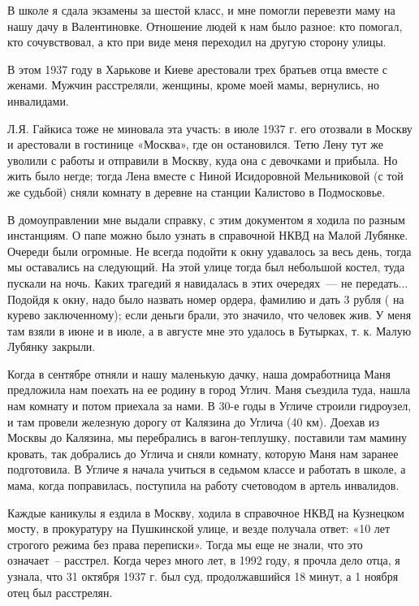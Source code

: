 В школе я сдала экзамены за шестой класс, и  мне помогли  перевезти  маму  на 
нашу  дачу в Валентиновке.  Отношение  людей  к нам  было  разное:  кто  помогал, 
кто сочувствовал, а кто при виде меня переходил на другую сторону улицы.

В этом  1937 году в Харькове и  Киеве  арестовали  трех  братьев  отца  вместе  с 
женами.  Мужчин  расстреляли,  женщины,  кроме  моей  мамы,  вернулись,  но 
инвалидами.

Л.Я. Гайкиса  тоже  не  миновала  эта  участь:  в  июле 1937 г.  его  отозвали  в 
Москву  и арестовали в гостинице «Москва», где он остановился. Тетю Лену  тут же 
уволили с работы и отправили в Москву, куда она с девочками  и  прибыла. Но  жить 
было негде; тогда  Лена вместе  с Ниной  Исидоровной  Мельниковой (с той же судьбой)
сняли комнату в  деревне на станции Калистово в Подмосковье.

В домоуправлении мне выдали справку, с этим документом  я ходила  по  разным 
инстанциям. О папе можно  было  узнать в справочной  НКВД  на  Малой Лубянке. 
Очереди были огромные. Не  всегда подойти  к окну удавалось  за  весь день,  тогда 
мы оставались  на следующий.  На  этой улице  тогда  был  небольшой  костел,  туда 
пускали на ночь.  Каких  трагедий  я  навидалась  в  этих  очередях~--- не передать... 
Подойдя к окну,  надо  было  назвать  номер  ордера, фамилию  и дать  3 рубля  ( на 
курево заключенному); если деньги брали,  это  значило, что  человек жив.  У меня 
там взяли  в июне  и в июле, а  в августе  мне это удалось  в Бутырках,  т. к.  Малую 
Лубянку закрыли.

Когда  в сентябре  отняли  и  нашу  маленькую  дачку,  наша  домработница 
Маня  предложила нам поехать  на ее родину  в  город Углич.  Маня  съездила туда, 
нашла нам комнату  и  потом  приехала  за  нами.  В  30-е  годы  в Угличе строили 
гидроузел, и  там  провели  железную  дорогу  от  Калязина  до  Углича (40 км). 
Доехав из Москвы  до Калязина, мы перебрались в вагон-теплушку,  поставили там
мамину  кровать, так  добрались  до Углича и  сняли  комнату,  которую  Маня нам 
заранее подготовила. В Угличе я  начала  учиться  в седьмом  классе  и работать  в 
школе, а  мама, когда  поправилась,  поступила  на  работу  счетоводом  в  артель 
инвалидов.

Каждые каникулы я ездила в Москву, ходила  в справочное  НКВД  на Кузнецком 
мосту,  в  прокуратуру  на  Пушкинской  улице,  и  везде  получала  ответ:  «10 лет 
строгого режима без права переписки».  Тогда мы  еще  не  знали, что это означает~-- 
расстрел.  Когда  через  много лет, в 1992 году, я  прочла  дело отца, я узнала, что 31 
октября 1937 г. был суд, продолжавшийся  18 минут, а 1  ноября отец был  расстрелян.

